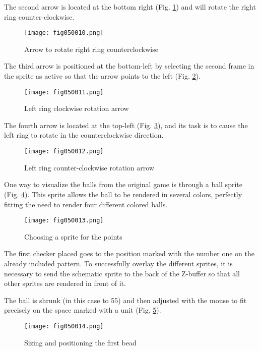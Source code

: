 The second arrow is located at the bottom right (Fig. \ref{fig050010}) and will rotate the right ring counter-clockwise.

\begin{figure}[H]
   \centering
   \texttt{[image: fig050010.png]}
   \caption{Arrow to rotate right ring counterclockwise}
\label{fig050010}
\end{figure}

The third arrow is positioned at the bottom-left by selecting the second frame in the sprite as active so that the arrow points to the left (Fig. \ref{fig050011}).

\begin{figure}[H]
   \centering
   \texttt{[image: fig050011.png]}
   \caption{Left ring clockwise rotation arrow}
\label{fig050011}
\end{figure}

The fourth arrow is located at the top-left (Fig. \ref{fig050012}), and its task is to cause the left ring to rotate in the counterclockwise direction.

\begin{figure}[H]
   \centering
   \texttt{[image: fig050012.png]}
   \caption{Left ring counter-clockwise rotation arrow}
\label{fig050012}
\end{figure}

One way to visualize the balls from the original game is through a ball sprite (Fig. \ref{fig050013}). This sprite allows the ball to be rendered in several colors, perfectly fitting the need to render four different colored balls.

\begin{figure}[H]
   \centering
   \texttt{[image: fig050013.png]}
   \caption{Choosing a sprite for the points}
\label{fig050013}
\end{figure}

The first checker placed goes to the position marked with the number one on the already included pattern. To successfully overlay the different sprites, it is necessary to send the schematic sprite to the back of the Z-buffer so that all other sprites are rendered in front of it.

The ball is shrunk (in this case to 55) and then adjusted with the mouse to fit precisely on the space marked with a unit (Fig. \ref{fig050014}).

\begin{figure}[H]
   \centering
   \texttt{[image: fig050014.png]}
   \caption{Sizing and positioning the first bead}
\label{fig050014}
\end{figure}

